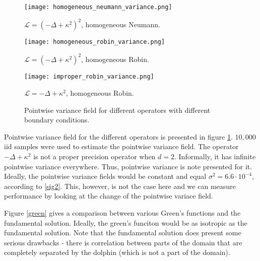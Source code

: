 \documentclass[paper=a4, fontsize=11pt]{scrartcl} %
\numberwithin{equation}{section} %
\numberwithin{figure}{section} %
\numberwithin{table}{section} %
\newcommand{\Op}{\mathcal{L}}
\begin{document}
\begin{figure}[!htb]
  \texttt{[image: homogeneous\_neumann\_variance.png]}
   \caption*{$\Op = (-\Delta + \kappa^2)^2$, homogeneous Neumann.}
\endminipage\hfill
{}
  \texttt{[image: homogeneous\_robin\_variance.png]}
   \caption*{$\Op = (-\Delta + \kappa^2)^2$, homogeneous Robin.}
\endminipage\hfill
{}
  \texttt{[image: improper\_robin\_variance.png]}
   \caption*{$\Op = -\Delta + \kappa^2$, homogeneous Robin.}
\endminipage
 \caption{Pointwise variance field for different operators with
   different boundary conditions.}
 \label{var}
\end{figure}
  
Pointwise variance field for the different operators is presented in figure \ref{var}.
$10,000$ iid samples were used to estimate the pointwise variance field. 
The operator $-\Delta + \kappa^2$ is not a proper precision operator when $d=2$. 
Informally, it has infinite pointwise variance everywhere. Thus, pointwise
variance is note presented for it. Ideally, the pointwise
variance fields would be constant and equal 
$\sigma^2 = 6.6 \cdot 10^{-4}$, according to \ref{sig2}. This, 
however, is not the case here and we can measure performance
by looking at the change of the pointwise variace field.

Figure \ref{green} gives a comparison between various Green's functions
and the fundamental solution. Ideally, the green's funciton would be as
isotropic as the fundamental solution. Note that the fundamental solution
does present some serious drawbacks - there is correlation between parts of
the domain that are completely separated by the dolphin (which is not
a part of the domain).





\end{document}
